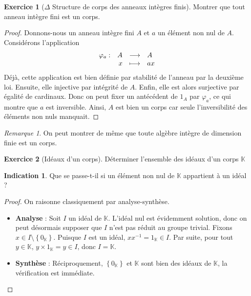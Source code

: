 \documentclass[french]{book}
\newcommand{\K}{\mathbb{K}}
\newcommand{\inv}{^{-1}}
\theoremstyle{definition}
\newtheorem{ex}{Exercice}[chapter]
\theoremstyle{theorem}
\newtheorem*{ind}{Indication}
\theoremstyle{remark}
\newtheorem*{rmq}{Remarque}
\begin{document}
\begin{ex}[$\Delta$ Structure de corps des anneaux intègres finis]
	Montrer que tout anneau intègre fini est un corps.
\end{ex}

\begin{proof}
	Donnons-nous un anneau intègre fini $A$ et $a$ un élément non nul de $A$. Considérons l'application
	$$
	\begin{array}[t]{lrcl}
		\varphi_a : & A & \longrightarrow & A \\
		& x & \longmapsto & ax
	\end{array}
	$$
	Déjà, cette application est bien définie par stabilité de l'anneau par la deuxième loi. Ensuite, elle injective par intégrité de $A$. Enfin, elle est alors surjective par égalité de cardinaux. Donc on peut fixer un antécédent de $1_A$ par $\varphi_a$, ce qui montre que $a$ est inversible. Ainsi, $A$ est bien un corps car seule l'inversibilité des éléments non nuls manquait.
\end{proof}

\begin{rmq}
	On peut montrer de même que toute algèbre intègre de dimension finie est un corps.
\end{rmq}

\begin{ex}[Idéaux d'un corps]
	Déterminer l'ensemble des idéaux d'un corps $\K$
\end{ex}

\begin{ind}
	Que se passe-t-il si un élément non nul de $\K$ appartient à un idéal ?
\end{ind}

\begin{proof}
	On raisonne classiquement par analyse-synthèse.
	\begin{itemize}
		\item \textbf{Analyse} : Soit $I$ un idéal de $\K$. L'idéal nul est évidemment solution, donc on peut désormais supposer que $I$ n'est pas réduit au groupe trivial. Fixons $x \in I\setminus\left\{0_\K \right\}$. Puisque $I$ est un idéal, $xx\inv=1_\K \in I$. Par suite, pour tout $y \in\K$, $y\times 1_\K=y \in I$, donc $I=\K$.
		\item \textbf{Synthèse} : Réciproquement, $\left\{0_\K \right\}$ et $\K$ sont bien des idéaux de $\K$, la vérification est immédiate.
	\end{itemize}
\end{proof}
\end{document}
